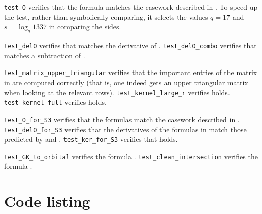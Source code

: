 \begin{enumerate}
  \ii \texttt{test\_O} verifies that the formula 
  matches the casework described in .
  To speed up the test, rather than symbolically comparing,
  it selects the values $q = 17$ and $s = \log_q 1337$ in comparing the sides.

  \ii \texttt{test\_delO} verifies that 
  matches the derivative of .
  \ii \texttt{test\_delO\_combo} verifies that 
  matches a subtraction of .

  \ii \texttt{test\_matrix\_upper\_triangular} verifies that the important entries
  of the matrix in  are computed correctly
  (that is, one indeed gets an upper triangular matrix
  when looking at the relevant rows).
  \ii \texttt{test\_kernel\_large\_r} verifies  holds.
  \ii \texttt{test\_kernel\_full} verifies  holds.

  \ii \texttt{test\_O\_for\_S3} verifies that the formulas
  match the casework described in .
  \ii \texttt{test\_delO\_for\_S3} verifies that the derivatives of the formulas in
  match those predicted by  and .
  \ii \texttt{test\_ker\_for\_S3} verifies that  holds.

  \ii \texttt{test\_GK\_to\_orbital} verifies the formula .
  \ii \texttt{test\_clean\_intersection} verifies the formula .
\end{enumerate}

\section{Code listing}

